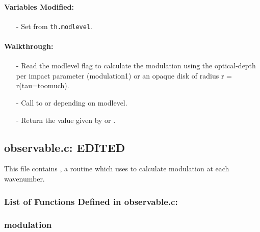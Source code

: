 \documentclass[letterpaper,12pt]{article}
\begin{document}
\paragraph{Variables Modified:}
\begin{enumerate}[leftmargin=10pt, noitemsep, parsep=0pt, topsep=0ex]
\item[-] Set  from {\tt th.modlevel}.
\end{enumerate}

\paragraph{Walkthrough:}
\begin{enumerate}[leftmargin=10pt, noitemsep, parsep=0pt, topsep=0ex]
\item[-] Read the modlevel flag to calculate the modulation using the
  optical-depth per impact parameter (modulation1) or an opaque disk
  of radius r = r(tau=toomuch).
\item[-] Call to  or  depending on
  modlevel.
\item[-] Return the value given by  or .
\end{enumerate}


\newpage
\subsection{observable.c: EDITED}
This file contains , a routine which uses  to calculate modulation at each wavenumber.
\subsubsection{List of Functions Defined in observable.c:}
 \newline

 \newline

 \newline

\subsubsection{modulation}
\end{document}

